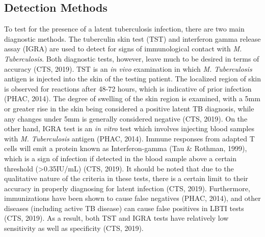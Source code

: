 \documentclass[sn-mathphys,Numbered]{sn-jnl}%
\theoremstyle{thmstyleone}%
\theoremstyle{thmstyletwo}%
\theoremstyle{thmstylethree}%
\begin{document}
\subsection{Detection Methods}
 To test for the presence of a latent tuberculosis infection, there are two main diagnostic methods. The tuberculin skin test (TST) and interferon gamma release assay (IGRA) are used to detect for signs of immunological contact with \textit{M. Tuberculosis}. Both diagnostic tests, however, leave much to be desired in terms of accuracy (CTS, 2019). TST is an \textit{in vivo} examination in which \textit{M. Tuberculosis} antigen is injected into the skin of the testing patient. The localized region of skin is observed for reactions after 48-72 hours, which is indicative of prior infection (PHAC, 2014). The degree of swelling of the skin region is examined, with a 5mm or greater rise in the skin being considered a positive latent TB diagnosis, while any changes under 5mm is generally considered negative (CTS, 2019). 
    On the other hand, IGRA test is an \textit{in vitro} test which involves injecting blood samples with \textit{M. Tuberculosis} antigen (PHAC, 2014). Immune responses from adapted T cells will emit a protein known as Interferon-gamma (Tau \& Rothman, 1999), which is a sign of infection if detected in the blood sample above a certain threshold (>0.35IU/mL) (CTS, 2019). It should be noted that due to the qualitative nature of the criteria in these tests, there is a certain limit to their accuracy in properly diagnosing for latent infection (CTS, 2019). Furthermore, immunizations have been shown to cause false negatives (PHAC, 2014), and other diseases (including active TB disease) can cause false positives in LBTI tests (CTS, 2019). As a result, both TST and IGRA tests have relatively low sensitivity as well as specificity (CTS, 2019).   
\end{document}

